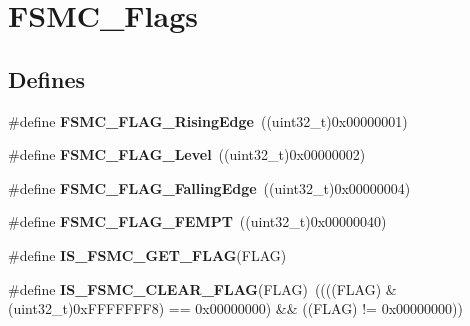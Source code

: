 \hypertarget{group__FSMC__Flags}{
\section{FSMC\_\-Flags}
\label{group__FSMC__Flags}
}
\subsection*{Defines}
\begin{DoxyCompactItemize}
\item 
\hypertarget{group__FSMC__Flags_ga5aadbd5d9f1b6a25bcc1fc6f3bf4c9cc}{
\#define {\bfseries FSMC\_\-FLAG\_\-RisingEdge}~((uint32\_\-t)0x00000001)}
\label{group__FSMC__Flags_ga5aadbd5d9f1b6a25bcc1fc6f3bf4c9cc}

\item 
\hypertarget{group__FSMC__Flags_ga25868d35780998a52190c424ebb3823f}{
\#define {\bfseries FSMC\_\-FLAG\_\-Level}~((uint32\_\-t)0x00000002)}
\label{group__FSMC__Flags_ga25868d35780998a52190c424ebb3823f}

\item 
\hypertarget{group__FSMC__Flags_gaaaa85bce06ed962874686ad7af0f0cb7}{
\#define {\bfseries FSMC\_\-FLAG\_\-FallingEdge}~((uint32\_\-t)0x00000004)}
\label{group__FSMC__Flags_gaaaa85bce06ed962874686ad7af0f0cb7}

\item 
\hypertarget{group__FSMC__Flags_ga8da2bd0b9d11877aaebaba0c77e8b0cc}{
\#define {\bfseries FSMC\_\-FLAG\_\-FEMPT}~((uint32\_\-t)0x00000040)}
\label{group__FSMC__Flags_ga8da2bd0b9d11877aaebaba0c77e8b0cc}

\item 
\#define {\bfseries IS\_\-FSMC\_\-GET\_\-FLAG}(FLAG)
\item 
\hypertarget{group__FSMC__Flags_ga1114bf56b54e726831b38fc8c5daa14e}{
\#define {\bfseries IS\_\-FSMC\_\-CLEAR\_\-FLAG}(FLAG)~((((FLAG) \& (uint32\_\-t)0xFFFFFFF8) == 0x00000000) \&\& ((FLAG) != 0x00000000))}
\label{group__FSMC__Flags_ga1114bf56b54e726831b38fc8c5daa14e}

\end{DoxyCompactItemize}



